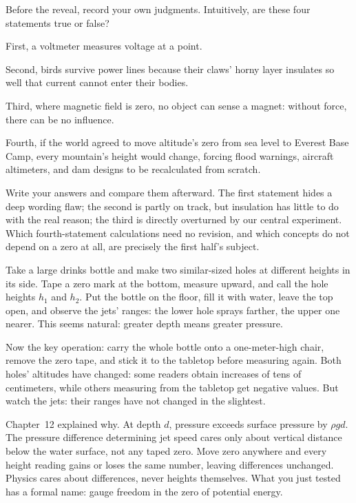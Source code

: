 
\begin{mainline}
Before the reveal, record your own judgments. Intuitively, are these four statements true or false?

First, a voltmeter measures voltage at a point.

Second, birds survive power lines because their claws' horny layer insulates so well that current cannot enter their bodies.

Third, where magnetic field is zero, no object can sense a magnet: without force, there can be no influence.

Fourth, if the world agreed to move altitude's zero from sea level to Everest Base Camp, every mountain's height would change, forcing flood warnings, aircraft altimeters, and dam designs to be recalculated from scratch.

Write your answers and compare them afterward. The first statement hides a deep wording flaw; the second is partly on track, but insulation has little to do with the real reason; the third is directly overturned by our central experiment. Which fourth-statement calculations need no revision, and which concepts do not depend on a zero at all, are precisely the first half's subject.
\end{mainline}


\begin{experiment}
Take a large drinks bottle and make two similar-sized holes at different heights in its side. Tape a zero mark at the bottom, measure upward, and call the hole heights \(h_1\) and \(h_2\). Put the bottle on the floor, fill it with water, leave the top open, and observe the jets' ranges: the lower hole sprays farther, the upper one nearer. This seems natural: greater depth means greater pressure.

Now the key operation: carry the whole bottle onto a one-meter-high chair, remove the zero tape, and stick it to the tabletop before measuring again. Both holes' altitudes have changed: some readers obtain increases of tens of centimeters, while others measuring from the tabletop get negative values. But watch the jets: their ranges have not changed in the slightest.

Chapter~12 explained why. At depth \(d\), pressure exceeds surface pressure by \(\rho g d\). The pressure difference determining jet speed cares only about vertical distance below the water surface, not any taped zero. Move zero anywhere and every height reading gains or loses the same number, leaving differences unchanged. Physics cares about differences, never heights themselves. What you just tested has a formal name: gauge freedom in the zero of potential energy.
\end{experiment}

